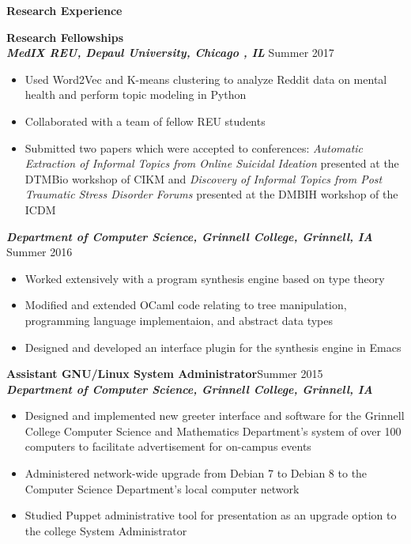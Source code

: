 \documentclass[9pt]{extarticle}
\begin{document}
\begin{large}
\begin{center}\textbf{Research Experience}
\end{center}
\end{large}
\textbf{Research Fellowships}\\
\textbf{\textit{MedIX REU, Depaul University, Chicago , IL}}
\hfill Summer 2017
\begin{itemize}
\item Used Word2Vec and K-means clustering to analyze Reddit data on
  mental health and perform topic modeling in Python
\item Collaborated with a team of fellow REU students
\item Submitted two papers which were accepted to conferences: \textit{Automatic
  Extraction of Informal Topics from Online Suicidal Ideation} 
presented at the
  DTMBio workshop of CIKM and \textit{Discovery of Informal Topics from Post Traumatic Stress
  Disorder Forums} presented at the DMBIH workshop of the ICDM 
\end{itemize}
\vspace{0.4cm}


\textbf{\textit{Department of Computer Science, Grinnell College,
    Grinnell, IA}}
\hfill Summer 2016
\begin{itemize}
\item Worked extensively with a program synthesis engine based on type theory
\item Modified and extended OCaml code relating to tree manipulation,
  programming language implementaion, and abstract data types
\item Designed and developed an interface plugin for the 
  synthesis engine in Emacs
\end{itemize}
\vspace{0.4cm}


\textbf{Assistant GNU/Linux System Administrator}\hfill Summer 2015\\
\textbf{\textit{Department of Computer Science, Grinnell College, Grinnell, IA}}
\begin{itemize}
\item Designed and implemented new greeter interface and 
  software for the Grinnell College Computer Science 
  and Mathematics Department's system of over 100 computers to 
  facilitate advertisement for on-campus events
\item Administered network-wide upgrade from Debian 7 to Debian 8 to
  the Computer Science Department's local computer network
\item Studied Puppet administrative tool for presentation as an upgrade option to the college System Administrator
\end{itemize}
\vspace{0.4cm}
\end{document}
